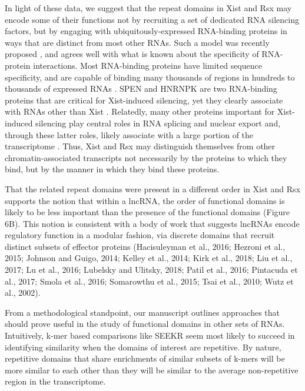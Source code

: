 In light of these data, we suggest that the repeat domains in Xist and Rsx may encode some of their functions not by recruiting a set of dedicated RNA silencing factors, but by engaging with ubiquitously-expressed RNA-binding proteins in ways that are distinct from most other RNAs. Such a model was recently proposed \cite{Brockdorff2018LocalNcRNA}, and agrees well with what is known about the specificity of RNA-protein interactions. Most RNA-binding proteins have limited sequence specificity, and are capable of binding many thousands of regions in hundreds to thousands of expressed RNAs \cite{Dominguez2018SequenceProteins,Ray2013ARegulation,VanNostrand2016RobusteCLIP}. SPEN and HNRNPK are two RNA-binding proteins that are critical for Xist-induced silencing, yet they clearly associate with RNAs other than Xist \cite{Cirillo2016QuantitativeEditor,VanNostrand2016RobusteCLIP}. Relatedly, many other proteins important for Xist-induced silencing play central roles in RNA splicing and nuclear export and, through these latter roles, likely associate with a large portion of the transcriptome \cite{Moindrot2015ASilencing}. Thus, Xist and Rsx may distinguish themselves from other chromatin-associated transcripts not necessarily by the proteins to which they bind, but by the manner in which they bind these proteins.

That the related repeat domains were present in a different order in Xist and Rsx supports the notion that within a lncRNA, the order of functional domains is likely to be less important than the presence of the functional domains (Figure 6B). This notion is consistent with a body of work that suggests lncRNAs encode regulatory function in a modular fashion, via discrete domains that recruit distinct subsets of effector proteins (Hacisuleyman et al., 2016; Hezroni et al., 2015; Johnson and Guigo, 2014; Kelley et al., 2014; Kirk et al., 2018; Liu et al., 2017; Lu et al., 2016; Lubelsky and Ulitsky, 2018; Patil et al., 2016; Pintacuda et al., 2017; Smola et al., 2016; Somarowthu et al., 2015; Tsai et al., 2010; Wutz et al., 2002). 

From a methodological standpoint, our manuscript outlines approaches that should prove useful in the study of functional domains in other sets of RNAs. Intuitively, k-mer based comparisons like SEEKR seem most likely to succeed in identifying similarity when the domains of interest are repetitive. By nature, repetitive domains that share enrichments of similar subsets of k-mers will be more similar to each other than they will be similar to the average non-repetitive region in the transcriptome. 

